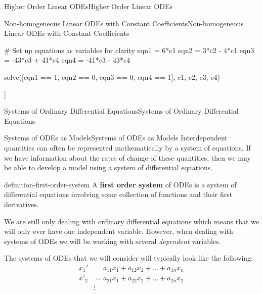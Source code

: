 \documentclass[10pt,]{book}
\newcommand{\terminology}[1]{\textbf{#1}}
\numberwithin{equation}{section}
\newcommand{\amp}{&}
\begin{document}
\begin{chapterptx}{Higher Order Linear ODEs}{}{Higher Order Linear ODEs}{}{}
\begin{sectionptx}{Non-homogeneous Linear ODEs with Constant Coefficients}{}{Non-homogeneous Linear ODEs with Constant Coefficients}{}{}
\begin{sageinput}
# Set up equations as variables for clarity
eqn1 = 6*c1
eqn2 = 3*c2 - 4*c1
eqn3 = -43*c3 + 41*c4
eqn4 = -41*c3 - 43*c4

solve([eqn1 == 1, eqn2 == 0, eqn3 == 0, eqn4 == 1], c1, c2, c3, c4)
\end{sageinput}
\begin{sageoutput}
[[c1 == (1/6), c2 == (2/9), c3 == (-41/3530), c4 == (-43/3530)]]
\end{sageoutput}
\end{sectionptx}
\end{chapterptx}
%
%
\typeout{************************************************}
\typeout{************************************************}
%
\begin{chapterptx}{Systems of Ordinary Differential Equations}{}{Systems of Ordinary Differential Equations}{}{}\label{systems-of-odes}
%
%
\typeout{************************************************}
\typeout{************************************************}
%
\begin{sectionptx}{Systems of ODEs as Models}{}{Systems of ODEs as Models}{}{}\label{section-systems-of-odes-as-models}
\hypertarget{p-297}{}%
Interdependent quantities can often be represented mathematically by a system of equations. If we have information about the rates of change of these quantities, then we may be able to develop a model using a system of differential equations.%
\begin{definition}{}{definition-first-order-system}%
\hypertarget{p-298}{}%
A \terminology{first order system} of ODEs is a system of differential equations involving some collection of functions and their first derivatives.%
\end{definition}
\hypertarget{p-299}{}%
We are still only dealing with ordinary differential equations which means that we will only ever have one independent variable. However, when dealing with systems of ODEs we will be working with several \emph{dependent} variables.%
\par
\hypertarget{p-300}{}%
The systems of ODEs that we will consider will typically look like the following:%
\begin{align*}
x_{1}'  \amp=  a_{11}x_{1} +a_{12}x_{2}+\dots+a_{1n}x_{n}\\
x'_{2}  \amp=  a_{21}x_{1} + a_{22}x_{2} + \dots + a_{2n}x_{2}\\
\amp\vdots\\

\end{align*}
\end{sectionptx}
\end{chapterptx}
\end{document}
